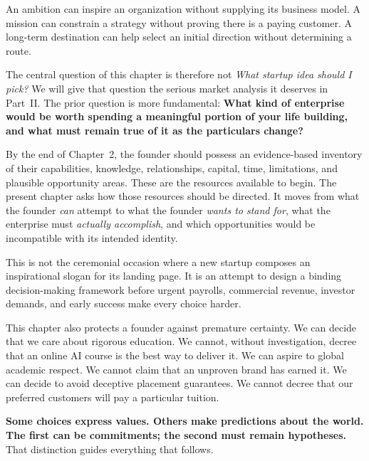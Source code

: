 An ambition can inspire an organization without supplying its business model. A mission can constrain a strategy without proving there is a paying customer. A long-term destination can help select an initial direction without determining a route.

The central question of this chapter is therefore not \textit{What startup idea should I pick?} We will give that question the serious market analysis it deserves in Part~II. The prior question is more fundamental: \textbf{What kind of enterprise would be worth spending a meaningful portion of your life building, and what must remain true of it as the particulars change?}

By the end of Chapter~2, the founder should possess an evidence-based inventory of their capabilities, knowledge, relationships, capital, time, limitations, and plausible opportunity areas. These are the resources available to begin. The present chapter asks how those resources should be directed. It moves from what the founder \textit{can} attempt to what the founder \textit{wants to stand for}, what the enterprise must \textit{actually accomplish}, and which opportunities would be incompatible with its intended identity.

This is not the ceremonial occasion where a new startup composes an inspirational slogan for its landing page. It is an attempt to design a binding decision-making framework before urgent payrolls, commercial revenue, investor demands, and early success make every choice harder.

This chapter also protects a founder against premature certainty. We can decide that we care about rigorous education. We cannot, without investigation, decree that an online AI course is the best way to deliver it. We can aspire to global academic respect. We cannot claim that an unproven brand has earned it. We can decide to avoid deceptive placement guarantees. We cannot decree that our preferred customers will pay a particular tuition. 

\textbf{Some choices express values. Others make predictions about the world. The first can be commitments; the second must remain hypotheses.} That distinction guides everything that follows.
